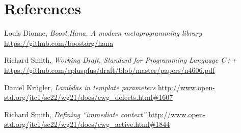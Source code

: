 \documentclass{wg21}
\begin{document}
\section{References}
\renewcommand{\section}[2]{}%
\begin{thebibliography}{9}

    Louis Dionne,
    \emph{Boost.Hana, A modern metaprogramming library}\newline
    \url{https://github.com/boostorg/hana}

    Richard Smith,
    \emph{Working Draft, Standard for Programming Language C++}\newline
    \url{https://github.com/cplusplus/draft/blob/master/papers/n4606.pdf}

    Daniel Kr{\"u}gler,
    \emph{Lambdas in template parameters}\newline
    \url{http://www.open-std.org/jtc1/sc22/wg21/docs/cwg_defects.html#1607}

    Richard Smith,
    \emph{Defining “immediate context”}\newline
    \url{http://www.open-std.org/jtc1/sc22/wg21/docs/cwg_active.html#1844}

\end{thebibliography}
\end{document}
